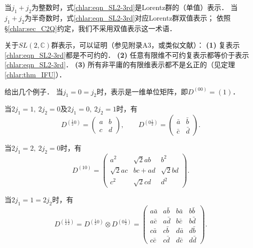 当$j_1+j_2$为整数时，式\eqref{chlar:eqn_SL2-3rd}是Lorentz群的（单值）表示．
当$j_1+j_2$为半奇数时，式\eqref{chlar:eqn_SL2-3rd}对应Lorentz群{\kaishu 双值表示}；
依照\S\ref{chlar:sec_C2Q}约定，我们不采用双值表示这一术语．

关于$SL(2,\mathbb{C})$群表示，可以证明（参见\parencite{carmeli-rl1976}附录A3，或类似文献）：
{\bfseries (1)} 复表示\eqref{chlar:eqn_SL2-3rd}都是不可约的．
{\bfseries (2)} 任意有限维不可约复表示都等价于表示\eqref{chlar:eqn_SL2-3rd}．
{\bfseries (3)} 所有非平庸的有限维表示都不是幺正的（见定理\ref{chlar:thm_IFU}）．


给出几个例子．
当$j_1=0=j_2$时，表示是一维单位矩阵，即$D^{(00)}=(1)$．

当$2j_1=1,\ 2j_2=0$及$2j_1=0,\ 2j_2=1$时，有
\begin{equation}
    D^{(\frac{1}{2}0)} = \begin{pmatrix} a & b   \\ c & d   \end{pmatrix},\qquad
    D^{(0\frac{1}{2})} = \begin{pmatrix} \bar{a} & \bar{b}   \\ \bar{c} & \bar{d}   \end{pmatrix}.
\end{equation}

当$2j_1=2,\ 2j_2=0$时，有
\begin{equation}
    D^{(10)} = \begin{pmatrix} 
            a^2 & \sqrt{2} a b & b^2 \\
            \sqrt{2} a c & b c+a d & \sqrt{2} b d \\
            c^2 & \sqrt{2} c d & d^2 
    \end{pmatrix}.
\end{equation}


当$2j_1=1= 2j_2$时，有
\begin{equation}
    D^{(\frac{1}{2}\frac{1}{2})} 
    =D^{(\frac{1}{2}0)} \otimes D^{(0\frac{1}{2})}
    =\begin{pmatrix} a \bar{a} & a \bar{b} & b \bar{a} & b \bar{b} \\
        a \bar{c} & a \bar{d} & b \bar{c} & b \bar{d} \\
        c \bar{a} & c \bar{b} & d \bar{a} & d \bar{b} \\
        c \bar{c} & c \bar{d} & d \bar{c} & d \bar{d} 
    \end{pmatrix}  .
\end{equation}




